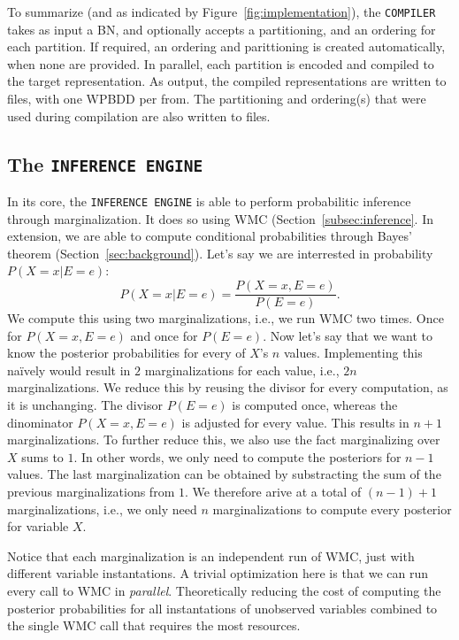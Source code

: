 To summarize (and as indicated by Figure~\ref{fig:implementation}), the \texttt{COMPILER} takes as input a BN, and optionally accepts a partitioning, and an ordering for each partition. If required, an ordering and parittioning is created automatically, when none are provided. In parallel, each partition is encoded and compiled to the target representation. As output, the compiled representations are written to files, with one WPBDD per from. The partitioning and ordering(s) that were used during compilation are also written to files.

\subsection{The \texttt{INFERENCE ENGINE}}

In its core, the \texttt{INFERENCE ENGINE} is able to perform probabilitic inference through marginalization. It does so using WMC (Section~\ref{subsec:inference}. In extension, we are able to compute conditional probabilities through Bayes' theorem (Section~\ref{sec:background}). Let's say we are interrested in probability $P(X = x | E = e)$:  \[P(X = x | E = e) = \frac{P(X = x, E = e)}{P(E = e)}.\]
We compute this using two marginalizations, i.e., we run WMC two times. Once for $P(X = x, E = e)$ and once for $P(E = e)$. Now let's say that we want to know the posterior probabilities for every of $X$'s $n$ values. Implementing this na\"ively would result in $2$ marginalizations for each value, i.e., $2n$ marginalizations. We reduce this by reusing the divisor for every computation, as it is unchanging. The divisor $P(E = e)$ is computed once, whereas the dinominator $P(X = x, E = e)$ is adjusted for every value. This results in $n + 1$ marginalizations. To further reduce this, we also use the fact marginalizing over $X$ sums to $1$. In other words, we only need to compute the posteriors for $n-1$ values. The last marginalization can be obtained by substracting the sum of the previous marginalizations from $1$. We therefore arive at a total of $(n-1) + 1$ marginalizations, i.e., we only need $n$ marginalizations to compute every posterior for variable $X$.

Notice that each marginalization is an independent run of WMC, just with different variable instantations. A trivial optimization here is that we can run every call to WMC in \emph{parallel}. Theoretically reducing the cost of computing the posterior probabilities for all instantations of unobserved variables combined to the single WMC call that requires the most resources.

